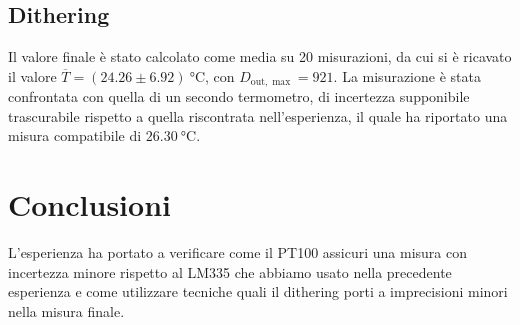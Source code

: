\documentclass{article}
\begin{document}
\subsection{Dithering}
\begin{table}[H]
    \caption{Misurazioni successive}
\end{table}
Il valore finale è stato calcolato come media su 20 misurazioni, da cui si è ricavato il valore $\overline{T}=(24.26\pm6.92)\SI{}{\celsius}$, con $D_{\text{out}, \max}=921$.
La misurazione è stata confrontata con quella di un secondo termometro, di incertezza supponibile trascurabile rispetto a quella riscontrata nell'esperienza, il quale ha riportato
una misura compatibile di $\SI{26.30}{\celsius}$. 
\section{Conclusioni}
L'esperienza ha portato a verificare come il PT100 assicuri una misura con incertezza minore rispetto al LM335 che abbiamo usato nella precedente esperienza e come utilizzare tecniche quali il dithering 
porti a imprecisioni minori nella misura finale.
\end{document}
